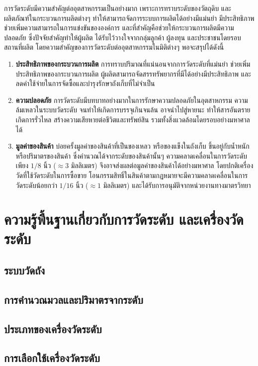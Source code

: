 \documentclass[final,11pt]{article}
\begin{document}
การวัดระดับมีความสำคัญต่ออุตสาหกรรมเป็นอย่างมาก เพราะการทราบระดับของวัตถุดิบ และผลิตภัณฑ์ในกระบวนการผลิตต่างๆ
ทำให้สามารถจัดการระบบการผลิตได้อย่างมีแม่นยำ มีประสิทธิภาพ ช่วยเพิ่มความสามารถในการแข่งขันขององค์การ 
และที่สำคัญคือช่วยให้กระบวนการผลิตมีความปลอดภัย ซึ่งปัจจัยสำคัญทำให้ผู้ผลิต ได้รับไว้วางใจจากกลุ่มลูกค้า ผู้ลงทุน และประชาชนโดยรอบสถานที่ผลิต
โดยความสำคัญของการวัดระดับต่ออุตสาหกรรมในมิติต่างๆ พอจะสรุปได้ดังนี้ 
\begin{enumerate}
    \item \textbf{ประสิทธิภาพของกระบวนการผลิต} การทราบปริมาณที่แน่นอนจากการวัดระดับที่แม่นยำ
    ช่วยเพิ่มประสิทธิภาพของกระบวนการผลิต ผู้ผลิตสามารถจัดสรรทรัพยากรที่มีได้อย่างมีประสิทธิภาพ 
    และลดค่าใช้จ่ายในการจัดซื้อและบำรุงรักษาถังเก็บที่ไม่จำเป็น
    \item \textbf{ความปลอดภัย} การวัดระดับมีบทบาทอย่างมากในการรักษาความปลอดภัยในอุตสาหกรรม
    ความล้มเหลวในระบบวัดระดับ จนทำให้เกิดการบรรจุเกินจนล้น อาจนำไปสู่หายนะ ทำให้สารอันตรายเกิดการรั่วไหล
    สร้างความเสียหายต่อชีวิตและทรัพย์สิน รวมทั้งสิ่งแวดล้อมโดยรอบอย่างมหาศาลได้ 
    \item \textbf{มูลค่าของสินค้า} บ่อยครั้งมูลค่าของสินค้าที่เป็นของเหลว หรือของแข็งในถังเก็บ
    ขึ้นอยู่กับน้ำหนัก หรือปริมาตรของสินค้า ซึ่งคำนวณได้จากระดับของสินค้านั้นๆ 
    ความคลาดเคลื่อนในการวัดระดับเพียง $1/8$ นิ้ว ($\approx 3$ มิลลิเมตร) 
    จึงอาจส่งผลต่อมูลค่าของสินค้าได้อย่างมหาศาล โดยปกติเครื่องวัดที่ใช้วัดระดับในการซื้อขาย
    โอนกรรมสิทธิ์ในสินค้าตามกฏหมายจะมีความคลาดเคลื่อนในการวัดระดับน้อยกว่า  $1/16$ นิ้ว ($\approx 1$ มิลลิเมตร)
    และได้รับการอนุมัติจากหน่วยงานทางมาตรวิทยา
\end{enumerate}
\section{ความรู้พื้นฐานเกี่ยวกับการวัดระดับ และเครื่องวัดระดับ}
\subsection{ระบบวัดถัง}
\subsection{การคำนวณมวลและปริมาตรจากระดับ}
\subsection{ประเภทของเครื่องวัดระดับ}
\subsection{การเลือกใช้เครื่องวัดระดับ}
\end{document}

